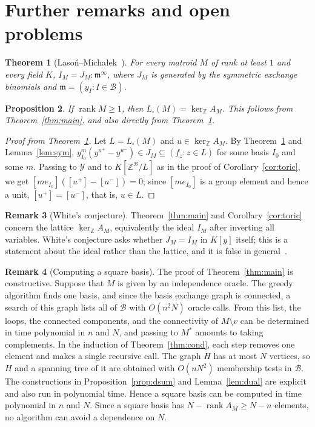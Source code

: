 \documentclass[11pt,a4paper]{article}
\theoremstyle{plain}
\newtheorem{theorem}{Theorem}[section]
\newtheorem{proposition}[theorem]{Proposition}
\theoremstyle{definition}
\newtheorem{remark}[theorem]{Remark}
\newcommand{\Z}{\mathbb Z}
\newcommand{\AM}{A_M}
\newcommand{\kerZ}{\ker_{\Z}\!A_M}
\newcommand{\sq}{L_{\square}}
\newcommand{\bs}{\mathcal B}
\newcommand{\rank}{\operatorname{rank}}
\newcommand{\LM}{Laso\'n--Micha\l{}ek}
\begin{document}
\section{Further remarks and open problems}\label{sec:caveats}
\begin{theorem}[\LM{}~\cite{LM14}]\label{thm:sat}
For every matroid $M$ of rank at least $1$ and every field $K$, $I_M=J_M:\mathfrak m^\infty$, where $J_M$ is generated by the symmetric exchange binomials and $\mathfrak m=(y_I:I\in\bs)$.
\end{theorem}

\begin{proposition}\label{prop:lattice}
If $\rank M\ge1$, then $\sq(M)=\kerZ$. This follows from Theorem~\ref{thm:main}, and also directly from Theorem~\ref{thm:sat}.
\end{proposition}
\begin{proof}[Proof from Theorem~\ref{thm:sat}]
Let $L=\sq(M)$ and $u\in\kerZ$. By Theorem~\ref{thm:sat} and Lemma~\ref{lem:sym}, $y_{I_0}^{m}(y^{u^+}-y^{u^-})\in J_M\subseteq(f_z:z\in L)$ for some basis $I_0$ and some $m$. Passing to $\mathcal Y$ and to $K[\Z^{\bs}/L]$ as in the proof of Corollary~\ref{cor:toric}, we get $[me_{I_0}]([u^+]-[u^-])=0$; since $[me_{I_0}]$ is a group element and hence a unit, $[u^+]=[u^-]$, that is, $u\in L$.
\end{proof}

\begin{remark}[White's conjecture]\label{rem:white}
Theorem~\ref{thm:main} and Corollary~\ref{cor:toric} concern the lattice $\kerZ$, equivalently the ideal $I_M$ after inverting all variables. White's conjecture asks whether $J_M=I_M$ in $K[y]$ itself; this is a statement about the ideal rather than the lattice, and it is false in general~\cite{Lar26}.
\end{remark}

\begin{remark}[Computing a square basis]\label{rem:alg}
The proof of Theorem~\ref{thm:main} is constructive. Suppose that $M$ is given by an independence oracle. The greedy algorithm finds one basis, and since the basis exchange graph is connected, a search of this graph lists all of $\bs$ with $O(n^2N)$ oracle calls. From this list, the loops, the connected components, and the connectivity of $M\setminus v$ can be determined in time polynomial in $n$ and $N$, and passing to $M^*$ amounts to taking complements. In the induction of Theorem~\ref{thm:cond}, each step removes one element and makes a single recursive call. The graph $H$ has at most $N$ vertices, so $H$ and a spanning tree of it are obtained with $O(nN^2)$ membership tests in $\bs$. The constructions in Proposition~\ref{prop:dsum} and Lemma~\ref{lem:dual} are explicit and also run in polynomial time. Hence a square basis can be computed in time polynomial in $n$ and $N$. Since a square basis has $N-\rank\AM\ge N-n$ elements, no algorithm can avoid a dependence on $N$.
\end{remark}
\end{document}
